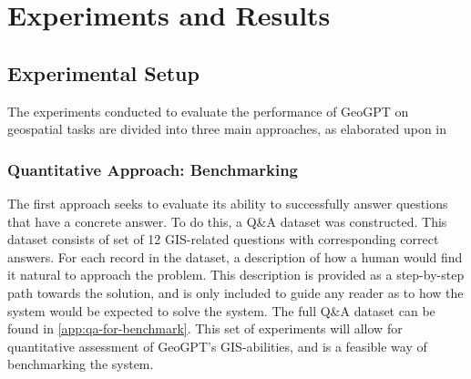 \chapter{Experiments and Results}
\label{cha:experiments}

\section{Experimental Setup}
\label{sec:experimental-setup}

\begin{comment}
Trying and failing is a major part of research. However, to have a chance of success you need a plan driving the experimental research, just as you need a plan for your literature search. Further, plans are made to be revised and this revision ensures that any further decisions made are in line with the work already completed.

The plan should include what experiments or series of experiments are planned and what questions the individual or set of experiments aim to answer. Such questions should be connected to your research questions, so that in the evaluation of your results you can discuss the results wrt to the research questions.
\end{comment}

\begin{comment}
The experimental setup should include all data --- parameters, etc. --- that would allow a person to repeat your experiments.
This will thus be the actual instantiation for each experiment of the general architecture described in Chapter~\ref{cha:architecture}.
\end{comment}

The experiments conducted to evaluate the performance of GeoGPT on geospatial tasks are divided into three main approaches, as elaborated upon in

\subsection{Quantitative Approach: Benchmarking}

The first approach seeks to evaluate its ability to successfully answer questions that have a concrete answer. To do this, a Q\&A dataset was constructed. This dataset consists of set of 12 GIS-related questions with corresponding correct answers. For each record in the dataset, a description of how a human would find it natural to approach the problem. This description is provided as a step-by-step path towards the solution, and is only included to guide any reader as to how the system would be expected to solve the system. The full Q\&A dataset can be found in \autoref{app:qa-for-benchmark}. This set of experiments will allow for quantitative assessment of GeoGPT's GIS-abilities, and is a feasible way of benchmarking the system.

